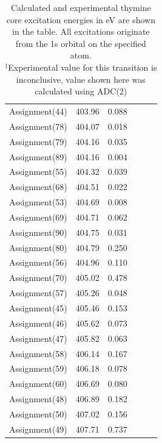 \documentclass[12pt]{article}
\begin{document}
\begin{table}
\begin{tabular}{c@{\hskip 0.22in}c@{\hskip 0.22in}c@{\hskip 0.52in}c@{\hskip 0.22in}c@{\hskip 0.22in}c}
 Assignment(44) & 403.96 & 0.088 \\
 Assignment(78) & 404.07 & 0.018 \\
 Assignment(79) & 404.16 & 0.035 \\
 Assignment(89) & 404.16 & 0.004 \\
 Assignment(55) & 404.32 & 0.039 \\
 Assignment(68) & 404.51 & 0.022 \\
 Assignment(53) & 404.69 & 0.008 \\
 Assignment(69) & 404.71 & 0.062 \\
 Assignment(90) & 404.75 & 0.031 \\
 Assignment(80) & 404.79 & 0.250 \\
 Assignment(56) & 404.96 & 0.110 \\
 Assignment(70) & 405.02 & 0.478 \\
 Assignment(57) & 405.26 & 0.048 \\
 Assignment(45) & 405.46 & 0.153 \\
 Assignment(46) & 405.62 & 0.073 \\
 Assignment(47) & 405.82 & 0.063 \\
 Assignment(58) & 406.14 & 0.167 \\
 Assignment(59) & 406.18 & 0.078 \\
 Assignment(60) & 406.69 & 0.080 \\
 Assignment(48) & 406.89 & 0.182 \\
 Assignment(50) & 407.02 & 0.156 \\
 Assignment(49) & 407.71 & 0.737 \\
    \end{tabular}
      \caption{Calculated and experimental thymine core excitation energies in eV are shown in the table. All excitations originate from the 1s orbital on the specified atom. \\
  $^{\ddagger}$Experimental value for this transition is inconclusive, value shown here was calculated using ADC(2)}
  \label{figure:MOs}
  \end{table}
\end{document}
